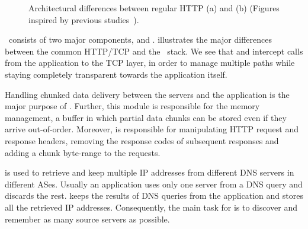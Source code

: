 \begin{figure}[t]
\begin{minipage}[t]{0.5\linewidth}
\begin{center}
        \end{center}
        \end{minipage}
        \caption{\label{fig:stack-architecture} Architectural differences between regular HTTP (a) and \mhttp (b) (Figures inspired by previous studies~\cite{JKIM14-TUND}\cite{KIMSIG}\cite{KIM13-MHTTP}).}
  \vspace*{-0.3cm}
\end{figure}

\mhttp~consists of two major components, \ie {} and . 
 illustrates the major differences between the common HTTP/TCP and the \mhttp~stack. 
We see that  and  intercept calls from the application to the TCP layer, in order to manage multiple paths while staying completely transparent towards the application itself. 

Handling chunked data delivery between the servers and the application is the major purpose of . 
Further, this module is responsible for the memory management, \ie a buffer in which partial data chunks can be stored even if they arrive out-of-order. 
Moreover,  is responsible for manipulating HTTP request and response headers, \ie removing the response codes of subsequent responses and adding a chunk byte-range to the requests. 

 is used to retrieve and keep multiple IP addresses from different DNS servers in different ASes.
Usually an application uses only one server from a DNS query and discards the rest. 
 keeps the results of DNS queries from the application and stores all the retrieved IP addresses. 
Consequently, the main task for  is to discover and remember as many source servers as possible. 

